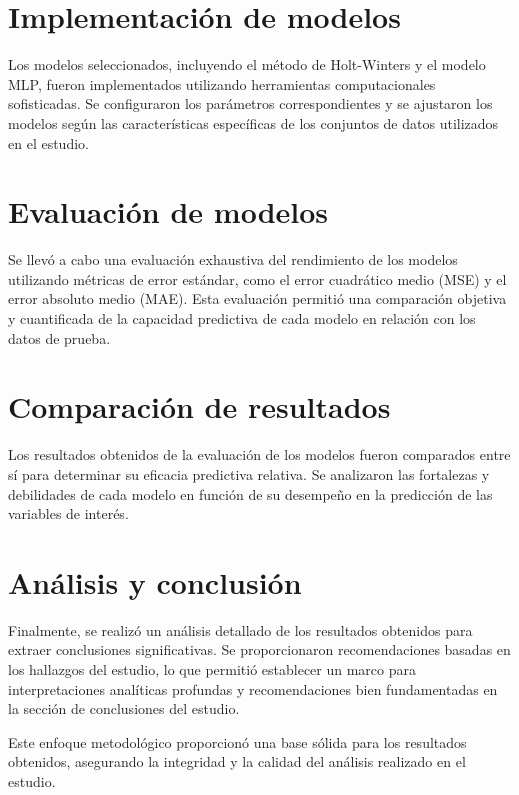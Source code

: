 \documentclass[
  us-letterpaper,
]{scrreprt}
\theoremstyle{plain}
\theoremstyle{definition}
\theoremstyle{definition}
\theoremstyle{plain}
\theoremstyle{remark}
\begin{document}
\section{Implementación de modelos}\label{implementaciuxf3n-de-modelos}

Los modelos seleccionados, incluyendo el método de Holt-Winters y el
modelo MLP, fueron implementados utilizando herramientas computacionales
sofisticadas. Se configuraron los parámetros correspondientes y se
ajustaron los modelos según las características específicas de los
conjuntos de datos utilizados en el estudio.

\section{Evaluación de modelos}\label{evaluaciuxf3n-de-modelos}

Se llevó a cabo una evaluación exhaustiva del rendimiento de los modelos
utilizando métricas de error estándar, como el error cuadrático medio
(MSE) y el error absoluto medio (MAE). Esta evaluación permitió una
comparación objetiva y cuantificada de la capacidad predictiva de cada
modelo en relación con los datos de prueba.

\section{Comparación de resultados}\label{comparaciuxf3n-de-resultados}

Los resultados obtenidos de la evaluación de los modelos fueron
comparados entre sí para determinar su eficacia predictiva relativa. Se
analizaron las fortalezas y debilidades de cada modelo en función de su
desempeño en la predicción de las variables de interés.

\section{Análisis y conclusión}\label{anuxe1lisis-y-conclusiuxf3n}

Finalmente, se realizó un análisis detallado de los resultados obtenidos
para extraer conclusiones significativas. Se proporcionaron
recomendaciones basadas en los hallazgos del estudio, lo que permitió
establecer un marco para interpretaciones analíticas profundas y
recomendaciones bien fundamentadas en la sección de conclusiones del
estudio.

Este enfoque metodológico proporcionó una base sólida para los
resultados obtenidos, asegurando la integridad y la calidad del análisis
realizado en el estudio.
\end{document}
